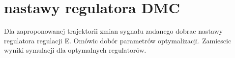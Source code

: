 \chapter{nastawy regulatora DMC}
Dla zaproponowanej trajektorii zmian sygnału zadanego dobrac nastawy regulatora
regulacji E. Omówic dobór parametrów optymalizacji. Zamiescic wyniki symulacji dla
optymalnych regulatorów.